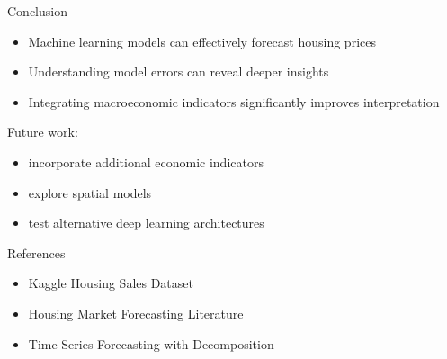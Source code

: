 \documentclass[slidescentered]{beamer}
\begin{document}
\begin{frame}{Conclusion}

    \begin{itemize}

        \item Machine learning models can effectively forecast housing prices

        \item Understanding model errors can reveal deeper insights

        \item Integrating macroeconomic indicators significantly improves interpretation

    \end{itemize}

    Future work:

    \begin{itemize}

        \item incorporate additional economic indicators

        \item explore spatial models

        \item test alternative deep learning architectures

    \end{itemize}

\end{frame}

\begin{frame}{References}

    \begin{itemize}

        \item Kaggle Housing Sales Dataset

        \item Housing Market Forecasting Literature

        \item Time Series Forecasting with Decomposition

    \end{itemize}

\end{frame}

\end{document}

